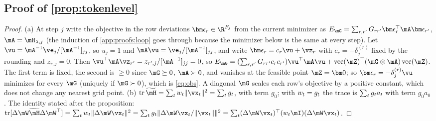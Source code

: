 \subsection{Proof of \texorpdfstring{\cref{prop:tokenlevel}}{Proposition 2}}
\label{app:proofs:tokenlevel}
\begin{proof}
(a) At step $j$ write the objective in the row deviations $\bm\epsilon_r\in\R^{F_j}$ from the current minimizer as $E_{\mG}=\sum_{r,r'}G_{rr'}\bm\epsilon_r^\top\mA\bm\epsilon_{r'}$, $\mA=\hess_{\lambda,j}$ (the induction of \cref{app:proofs:loop} goes through because the minimizer below is the same at every step).
Let $\vu=\mA^{-1}\ve_j/[\mA^{-1}]_{jj}$, so $u_j=1$ and $\mA\vu=\ve_j/[\mA^{-1}]_{jj}$, and write $\bm\epsilon_r=c_r\vu+\vz_r$ with $c_r=-\delta^{(r)}_j$ fixed by the rounding and $z_{r,j}=0$.
Then $\vu^\top\mA\vz_{r'}=z_{r',j}/[\mA^{-1}]_{jj}=0$, so $E_{\mG}=(\sum_{r,r'}G_{rr'}c_rc_{r'})\vu^\top\mA\vu+\operatorname{vec}(\mZ)^\top(\mG\otimes\mA)\operatorname{vec}(\mZ)$.
The first term is fixed, the second is $\ge0$ since $\mG\succeq0$, $\mA\succ0$, and vanishes at the feasible point $\mZ=\bm0$; so $\bm\epsilon_r=-\delta^{(r)}_j\vu$ minimizes for every $\mG$ (uniquely if $\mG\succ0$), which is \cref{eq:obs}.
A diagonal $\mG$ scales each row's objective by a positive constant, which does not change any nearest grid point.
(b) $\operatorname{tr}\hessw=\sum_t\wtok\|\vx_t\|^2=\sum_t\gsens$, with \bos{} term $g_0$; with $w_t=g_t$ the trace is $\sum_tg_t a_t$ with \bos{} term $g_0a_0$.
The identity stated after the proposition: $\operatorname{tr}[\Delta\mW\hessw\Delta\mW^\top]=\sum_t\wtok\|\Delta\mW\vx_t\|^2=\sum_t\gsens\|\Delta\mW\vx_t/\|\vx_t\|\|^2=\sum_t(\Delta\mW\vx_t)^\top(\wtok\mI)(\Delta\mW\vx_t)$.
\end{proof}
